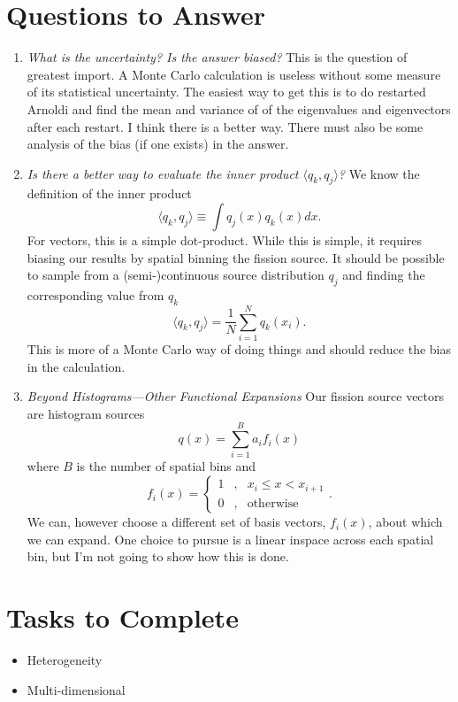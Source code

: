 \documentclass[11pt]{article}
\begin{document}
\section{Questions to Answer}
\begin{enumerate}
    \item \emph{What is the uncertainty?  Is the answer biased?}  This is the question of greatest import.  A Monte Carlo calculation is useless without some measure of its statistical uncertainty.  The easiest way to get this is to do restarted Arnoldi and find the mean and variance of of the eigenvalues and eigenvectors after each restart.  I think there is a better way.  There must also be some analysis of the bias (if one exists) in the answer.
    \item \emph{Is there a better way to evaluate the inner product $\langle q_k, q_j \rangle$?}  We know the definition of the inner product
    \begin{equation}
        \langle q_k, q_j \rangle \equiv \int q_j(x)q_k(x) dx.   \label{eq:InnerProduct}
    \end{equation}
    For vectors, this is a simple dot-product.  While this is simple, it requires biasing our results by spatial binning the fission source.  It should be possible to sample from a (semi-)continuous source distribution $q_j$ and finding the corresponding value from $q_k$
    \begin{equation}
        \langle q_k, q_j \rangle  = \frac{1}{N}\sum_{i=1}^N q_k(x_i).
    \end{equation}
    This is more of a Monte Carlo way of doing things and should reduce the bias in the calculation.
    \item \emph{Beyond Histograms---Other Functional Expansions}  Our fission source vectors are histogram sources
    \begin{equation}
        q(x) = \sum_{i=1}^B a_if_i(x)
    \end{equation}
    where $B$ is the number of spatial bins and
    \begin{equation}
        f_i(x) = \left \{
            \begin{array}{ccc}
                1 &,& x_{i} \leq x < x_{i+1} \\
                0 &,& \mathrm{otherwise}
            \end{array}\right. .
    \end{equation}
    We can, however choose a different set of basis vectors, $f_i(x)$, about which we can expand. One choice to pursue is a linear inspace across each spatial bin, but I'm not going to show how this is done.

\end{enumerate}

\section{Tasks to Complete}
\begin{itemize}
    \item Heterogeneity
    \item Multi-dimensional
\end{itemize}
\end{document}
